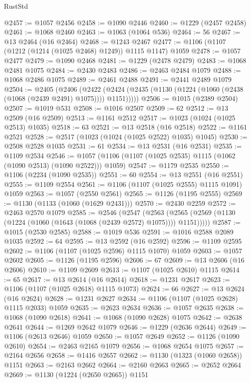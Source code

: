 \begin{lexlean}{RustStd}
\begin{coremodule}
@2457 := @1057 @2456
@2458 := @1090 @2446
@2460 := @1229 (@2457 @2458)
@2461 := @1068 @2460
@2463 := @1063 (@1064 @536)
@2464 := 56
@2467 := @13 @2464 (@16 @2464)
@2468 := @1243 @2467
@2477 := @1106 (@1107 (@1212 (@1214 (@1025 @2468) @1249)) @1115 @1147) @1059
@2478 := @1057 @2477
@2479 := @1090 @2468
@2481 := @1229 (@2478 @2479)
@2483 := @1068 @2481 @1075
@2484 := @2430 @2483
@2486 := @2463 @2484 @1079
@2488 := @1068 @2486 @1075
@2489 := @2461 @2488
@2491 := @2441 @2489 @1079
@2504 := @2405
    (@2406
      (@2422 (@2424 (@2435 (@1130 (@1224 (@1060 (@2438 (@1068 (@2439 @2491) @1075)))) @1151)))))
@2506 := @1015 (@2389 @2504)
@2507 := @1019 @531
@2508 := @1016 @2507
@2509 := 62
@2512 := @13 @2509 (@16 @2509)
@2513 := @1161 @2512
@2517 := @1023 (@1024 (@1025 @2513) @1035)
@2518 := 63
@2521 := @13 @2518 (@16 @2518)
@2522 := @1161 @2521
@2528 := @2517 (@1023 (@1024 (@1025 @2522) @1035) @1045)
@2530 := @2508 @2528 @1035
@2531 := 61
@2534 := @13 @2531 (@16 @2531)
@2535 := @1109 @2534
@2546 := @1057 (@1106 (@1107 (@1025 @2535) @1115 (@1062 (@1090 @2513) (@1090 @2522))) @1059)
@2547 := @1179 @2535
@2550 := @1106 (@2234 (@1090 @2535))
@2551 := 60
@2554 := @13 @2551 (@16 @2551)
@2555 := @1109 @2554
@2561 := @1106 (@1107 (@1025 @2555) @1115 @1091) @1059
@2563 := @1057 (@2550 @2561)
@2565 := @1126 (@1195 @2555)
@2569 := @1130 (@1133 (@1060 (@1629 @2431)))
@2570 := @2430 @2259
@2572 := @2463 @2570 @1079
@2585 := @2546
    (@2547
      (@2563 (@2565 (@2569 (@1130 (@1224 (@1060 (@1643 (@1068 (@2439 @2572) @1075)))) @1151)))))
@2587 := @1015 (@2530 @2585)
@2588 := @1019 @536
@2591 := @1016 @2588 @2089 @1035
@2592 := 64
@2595 := @13 @2592 (@16 @2592)
@2596 := @1109 @2595
@2602 := @1106 (@1107 (@1025 @2596) @1115 @1070) @1059
@2603 := @1057 @2602
@2605 := @1126 (@1195 @2596)
@2606 := 67
@2609 := @13 @2606 (@16 @2606)
@2610 := @1109 @2609
@2613 := @1107 (@1025 @2610) @1115
@2614 := 65
@2617 := @13 @2614 (@16 @2614)
@2618 := @1231 @2617
@2623 := @1106 (@1107 (@1025 @2618) @1115 @1073)
@2624 := 66
@2627 := @13 @2624 (@16 @2624)
@2628 := @1231 @2627
@2634 := @1106 (@1107 (@1025 @2628) @1115 @2033) @1059
@2635 := @2623 @2634
@2636 := @1057 @2635
@2638 := @1068 (@1090 @2618)
@2641 := @1068 (@1090 @2628) @1075
@2642 := @2638 @2641
@2644 := @1269 @2642 @1079
@2646 := @1229 (@2636 @2644)
@2649 := @1106 (@2613 @2646) @1059
@2650 := @1057 @2649
@2652 := @1126 (@1090 @2610)
@2654 := @2463 @2165 @1079
@2656 := @1068 @2654 @1075
@2657 := @2164 @2656
@2658 := @1416 @2657
@2662 := @1130 (@1323 (@1060 @2658)) @1151
@2663 := @2163 @2662
@2664 := @2160 @2663
@2665 := @2652 @2664
@2669 := @1130 (@1224 (@2650 @2665)) @1151

\end{coremodule}
\end{lexlean}
